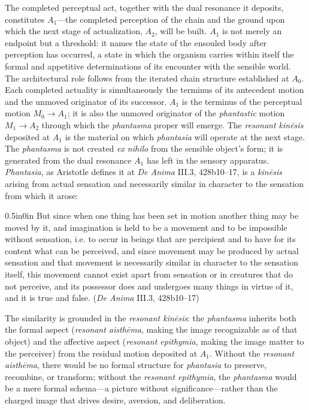 The completed perceptual act, together with the dual resonance it deposits, constitutes $A_1$---the completed perception of the chain and the ground upon which the next stage of actualization, $A_2$, will be built. $A_1$ is not merely an endpoint but a threshold: it names the state of the ensouled body after perception has occurred, a state in which the organism carries within itself the formal and appetitive determinations of its encounter with the sensible world. The architectural role follows from the iterated chain structure established at $A_0$. Each completed actuality is simultaneously the terminus of its antecedent motion and the unmoved originator of its successor. $A_1$ is the terminus of the perceptual motion $M_0 \rightarrow A_1$; it is also the unmoved originator of the \textit{phantastic} motion $M_1 \rightarrow A_2$ through which the \textit{phantasma} proper will emerge. The \textit{resonant kinēsis} deposited at $A_1$ is the material on which \textit{phantasia} will operate at the next stage. The \textit{phantasma} is not created \textit{ex nihilo} from the sensible object's form; it is generated from the dual resonance $A_1$ has left in the sensory apparatus. \textit{Phantasia}, as Aristotle defines it at \textit{De Anima} III.3, 428b10--17, is a \textit{kinēsis} arising from actual sensation and necessarily similar in character to the sensation from which it arose:
\begin{adjustwidth}{0.5in}{0in}
But since when one thing has been set in motion another thing may be moved by it, and imagination is held to be a movement and to be impossible without sensation, i.e. to occur in beings that are percipient and to have for its content what can be perceived, and since movement may be produced by actual sensation and that movement is necessarily similar in character to the sensation itself, this movement cannot exist apart from sensation or in creatures that do not perceive, and its possessor does and undergoes many things in virtue of it, and it is true and false. (\textit{De Anima} III.3, 428b10--17)
\end{adjustwidth}
The similarity is grounded in the \textit{resonant kinēsis}: the \textit{phantasma} inherits both the formal aspect (\textit{resonant aisthēma}, making the image recognizable as of that object) and the affective aspect (\textit{resonant epithymia}, making the image matter to the perceiver) from the residual motion deposited at $A_1$. Without the \textit{resonant aisthēma}, there would be no formal structure for \textit{phantasia} to preserve, recombine, or transform; without the \textit{resonant epithymia}, the \textit{phantasma} would be a mere formal schema---a picture without significance---rather than the charged image that drives desire, aversion, and deliberation.


